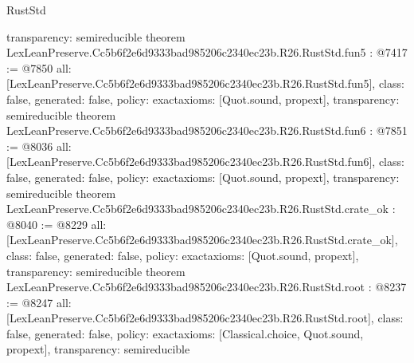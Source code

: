 \begin{lexlean}{RustStd}
\begin{coremodule}
{  transparency: semireducible
}
theorem LexLeanPreserve.Cc5b6f2e6d9333bad985206c2340ec23b.R26.RustStd.fun5 : @7417 := @7850 {
  all: [LexLeanPreserve.Cc5b6f2e6d9333bad985206c2340ec23b.R26.RustStd.fun5],
  class: false,
  generated: false,
  policy: exact{axioms: [Quot.sound, propext]},
  transparency: semireducible
}
theorem LexLeanPreserve.Cc5b6f2e6d9333bad985206c2340ec23b.R26.RustStd.fun6 : @7851 := @8036 {
  all: [LexLeanPreserve.Cc5b6f2e6d9333bad985206c2340ec23b.R26.RustStd.fun6],
  class: false,
  generated: false,
  policy: exact{axioms: [Quot.sound, propext]},
  transparency: semireducible
}
theorem LexLeanPreserve.Cc5b6f2e6d9333bad985206c2340ec23b.R26.RustStd.crate_ok : @8040 := @8229 {
  all: [LexLeanPreserve.Cc5b6f2e6d9333bad985206c2340ec23b.R26.RustStd.crate_ok],
  class: false,
  generated: false,
  policy: exact{axioms: [Quot.sound, propext]},
  transparency: semireducible
}
theorem LexLeanPreserve.Cc5b6f2e6d9333bad985206c2340ec23b.R26.RustStd.root : @8237 := @8247 {
  all: [LexLeanPreserve.Cc5b6f2e6d9333bad985206c2340ec23b.R26.RustStd.root],
  class: false,
  generated: false,
  policy: exact{axioms: [Classical.choice, Quot.sound, propext]},
  transparency: semireducible
}


\end{coremodule}
\end{lexlean}
